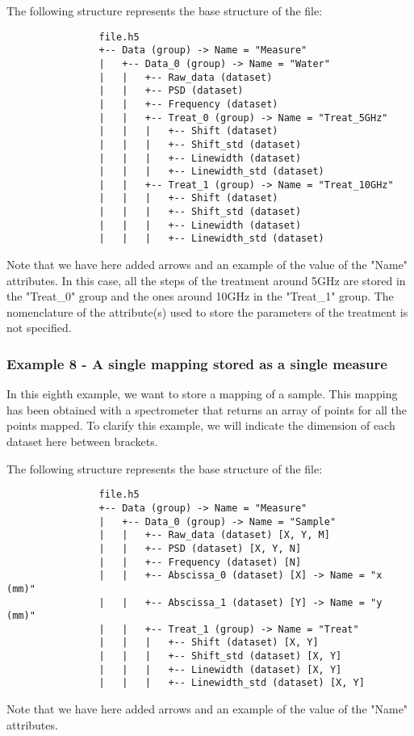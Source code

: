 \documentclass{article}
\begin{document}
            The following structure represents the base structure of the file:
            \begin{verbatim}
                file.h5
                +-- Data (group) -> Name = "Measure"
                |   +-- Data_0 (group) -> Name = "Water"
                |   |   +-- Raw_data (dataset)
                |   |   +-- PSD (dataset)
                |   |   +-- Frequency (dataset)
                |   |   +-- Treat_0 (group) -> Name = "Treat_5GHz"
                |   |   |   +-- Shift (dataset)
                |   |   |   +-- Shift_std (dataset)
                |   |   |   +-- Linewidth (dataset)
                |   |   |   +-- Linewidth_std (dataset)
                |   |   +-- Treat_1 (group) -> Name = "Treat_10GHz"
                |   |   |   +-- Shift (dataset)
                |   |   |   +-- Shift_std (dataset)
                |   |   |   +-- Linewidth (dataset)
                |   |   |   +-- Linewidth_std (dataset)
            \end{verbatim}
            Note that we have here added arrows and an example of the value of the "Name" attributes.
            In this case, all the steps of the treatment around 5GHz are stored in the "Treat\_0" group and the ones around 10GHz in the "Treat\_1" group. The nomenclature of the attribute(s) used to store the parameters of the treatment is not specified.

        \subsubsection{Example 8 - A single mapping stored as a single measure}
            In this eighth example, we want to store a mapping of a sample. This mapping has been obtained with a spectrometer that returns an array of points for all the points mapped. To clarify this example, we will indicate the dimension of each dataset here between brackets.

            The following structure represents the base structure of the file:
            \begin{verbatim}
                file.h5
                +-- Data (group) -> Name = "Measure"
                |   +-- Data_0 (group) -> Name = "Sample"
                |   |   +-- Raw_data (dataset) [X, Y, M]
                |   |   +-- PSD (dataset) [X, Y, N]
                |   |   +-- Frequency (dataset) [N]
                |   |   +-- Abscissa_0 (dataset) [X] -> Name = "x (mm)"
                |   |   +-- Abscissa_1 (dataset) [Y] -> Name = "y (mm)"
                |   |   +-- Treat_1 (group) -> Name = "Treat"
                |   |   |   +-- Shift (dataset) [X, Y]
                |   |   |   +-- Shift_std (dataset) [X, Y]
                |   |   |   +-- Linewidth (dataset) [X, Y]
                |   |   |   +-- Linewidth_std (dataset) [X, Y]
            \end{verbatim}
            Note that we have here added arrows and an example of the value of the "Name" attributes.
        
\end{document}
